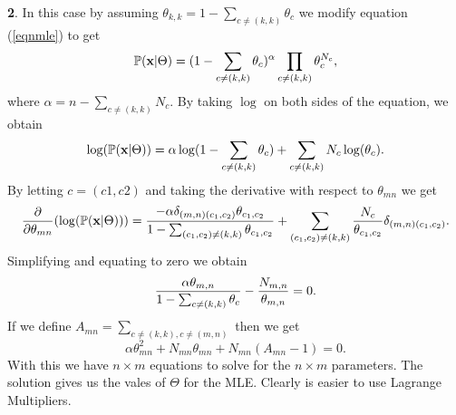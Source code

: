 \documentclass{article}
\begin{document}
\textbf{2}.
\newline
In this case by assuming $\theta_{k,k}=1-\sum_{c\neq (k,k)}\theta_{c}$ we modify equation (\ref{eqnmle}) to get
\begin{equation*}
\mathbb{P}(\textbf{x}|\Theta)=(1-\sum_{c\neq (k,k)}\theta_{c})^{\alpha}\prod_{c\neq (k,k)}\theta_{c}^{N_{c}},
\end{equation*}
where $\alpha=n-\sum_{c\neq (k,k)}N_{c}$. By taking $\log$ on both sides of the equation, we obtain
\begin{equation*}
\log(\mathbb{P}(\textbf{x}|\Theta))=\alpha\log(1-\sum_{c\neq (k,k)}\theta_{c})+\sum_{c\neq (k,k)}N_{c}\log(\theta_{c}).
\end{equation*}
By letting $c=(c1,c2)$ and taking the derivative with respect to $\theta_{mn}$ we get
\begin{equation*}
\frac{\partial}{\partial\theta_{mn}}(\log(\mathbb{P}(\textbf{x}|\Theta)))=\frac{-\alpha\delta_{(m,n)(c_{1},c_{2})}\theta_{c_{1},c_{2}}}{1-\sum_{(c_{1},c_{2})\neq (k,k)}\theta_{c_1,c_2}}
+\sum_{(c_{1},c_{2})\neq (k,k)}\frac{N_{c}}{\theta_{c_{1},c_{2}}}\delta_{(m,n)(c_{1},c_{2})}.
\end{equation*}
Simplifying and equating to zero we obtain
\begin{equation*}
\frac{\alpha\theta_{m,n}}{1-\sum_{c\neq (k,k)}\theta_{c}}-\frac{N_{m,n}}{\theta_{m,n}}=0.
\end{equation*}
If we define $A_{mn}=\sum_{c\neq (k,k),c\neq (m,n)}$ then we get
\begin{equation*}
\alpha\theta_{mn}^{2}+N_{mn}\theta_{mn}+N_{mn}(A_{mn}-1)=0.
\end{equation*}
With this we have $n\times m$ equations to solve for the $n\times m$ parameters. The solution gives us the vales of $\Theta$ for the MLE. Clearly is easier to use Lagrange Multipliers.
\newpage
\end{document}
